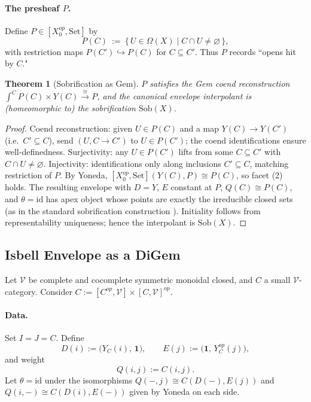 \documentclass[11pt]{article}
\theoremstyle{plain}
\newtheorem{theorem}{Theorem}[section]
\theoremstyle{definition}
\theoremstyle{remark}
\newcommand{\V}{\mathcal{V}}
\newcommand{\Set}{\mathrm{Set}}
\newcommand{\Sob}{\mathrm{Sob}}
\begin{document}
\paragraph{The presheaf $P$.}
Define $P\in [X_0^{op},\Set]$ by
$$
P(C) \ :=\ \{\,U\in \Omega(X)\mid C\cap U\neq \varnothing\,\},
$$
with restriction maps $P(C')\hookrightarrow P(C)$ for $C\subseteq C'$. Thus $P$ records ``opens hit by $C$."

\begin{theorem}[Sobrification as Gem]
$P$ satisfies the Gem coend reconstruction $\int^{C}P(C)\times Y(C)\xrightarrow{\ \cong\ } P$, and the canonical envelope interpolant is (homeomorphic to) the sobrification $\Sob(X)$.
\end{theorem}

\begin{proof}
Coend reconstruction: given $U\in P(C)$ and a map $Y(C)\to Y(C')$ (i.e.\ $C'\subseteq C$), send $(U,C\to C')$ to $U\in P(C')$; the coend identifications ensure well-definedness. Surjectivity: any $U\in P(C')$ lifts from some $C\subseteq C'$ with $C\cap U\neq\varnothing$. Injectivity: identifications only along inclusions $C'\subseteq C$, matching restriction of $P$. By Yoneda, $[X_0^{op},\Set](Y(C),P)\cong P(C)$, so facet (2) holds. The resulting envelope with $D=Y$, $E$ constant at $P$, $Q(C)\cong P(C)$, and $\theta=\mathrm{id}$ has apex object whose points are exactly the irreducible closed sets (as in the standard sobrification construction \cite{johnstone1982stone}). Initiality follows from representability uniqueness; hence the interpolant is $\Sob(X)$.
\end{proof}

\subsection{Isbell Envelope as a DiGem}\label{ssec:digem-isbell}

Let $\V$ be complete and cocomplete symmetric monoidal closed, and $C$ a small $\V$-category. Consider $C:=[C^{op},\V]\times [C,\V]^{op}$.

\paragraph{Data.}
Set $I=J=C$. Define
$$
D(i) := \big(Y_C(i),\,\mathbf{1}\big),\qquad
E(j) := \big(\mathbf{1},\,Y_C^{op}(j)\big),
$$
and weight
$$
Q(i,j) := C(i,j).
$$
Let $\theta=\mathrm{id}$ under the isomorphisms $Q(-,j)\cong C(D(-),E(j))$ and $Q(i,-)\cong C(D(i),E(-))$ given by Yoneda on each side.
\end{document}
